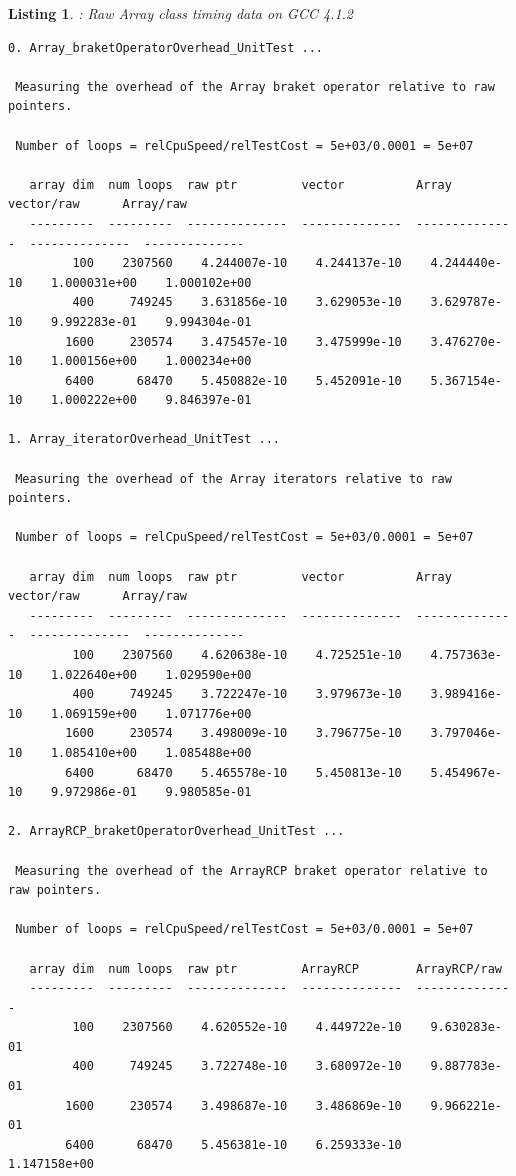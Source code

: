 \documentclass[pdf,ps2pdf,11pt]{SANDreport}
\newtheorem{listing}{Listing}
\begin{document}
\begin{listing}: Raw Array class timing data on GCC 4.1.2  \\
\label{listing:Array-GCC-Timings}
{\scriptsize\begin{verbatim}
0. Array_braketOperatorOverhead_UnitTest ... 
 
 Measuring the overhead of the Array braket operator relative to raw pointers.
 
 Number of loops = relCpuSpeed/relTestCost = 5e+03/0.0001 = 5e+07
 
   array dim  num loops  raw ptr         vector          Array           vector/raw      Array/raw     
   ---------  ---------  --------------  --------------  --------------  --------------  --------------
         100    2307560    4.244007e-10    4.244137e-10    4.244440e-10    1.000031e+00    1.000102e+00
         400     749245    3.631856e-10    3.629053e-10    3.629787e-10    9.992283e-01    9.994304e-01
        1600     230574    3.475457e-10    3.475999e-10    3.476270e-10    1.000156e+00    1.000234e+00
        6400      68470    5.450882e-10    5.452091e-10    5.367154e-10    1.000222e+00    9.846397e-01

1. Array_iteratorOverhead_UnitTest ... 
 
 Measuring the overhead of the Array iterators relative to raw pointers.
 
 Number of loops = relCpuSpeed/relTestCost = 5e+03/0.0001 = 5e+07
 
   array dim  num loops  raw ptr         vector          Array           vector/raw      Array/raw     
   ---------  ---------  --------------  --------------  --------------  --------------  --------------
         100    2307560    4.620638e-10    4.725251e-10    4.757363e-10    1.022640e+00    1.029590e+00
         400     749245    3.722247e-10    3.979673e-10    3.989416e-10    1.069159e+00    1.071776e+00
        1600     230574    3.498009e-10    3.796775e-10    3.797046e-10    1.085410e+00    1.085488e+00
        6400      68470    5.465578e-10    5.450813e-10    5.454967e-10    9.972986e-01    9.980585e-01

2. ArrayRCP_braketOperatorOverhead_UnitTest ... 
 
 Measuring the overhead of the ArrayRCP braket operator relative to raw pointers.
 
 Number of loops = relCpuSpeed/relTestCost = 5e+03/0.0001 = 5e+07
 
   array dim  num loops  raw ptr         ArrayRCP        ArrayRCP/raw  
   ---------  ---------  --------------  --------------  --------------
         100    2307560    4.620552e-10    4.449722e-10    9.630283e-01
         400     749245    3.722748e-10    3.680972e-10    9.887783e-01
        1600     230574    3.498687e-10    3.486869e-10    9.966221e-01
        6400      68470    5.456381e-10    6.259333e-10    1.147158e+00


\end{verbatim}}
\end{listing}
\end{document}
